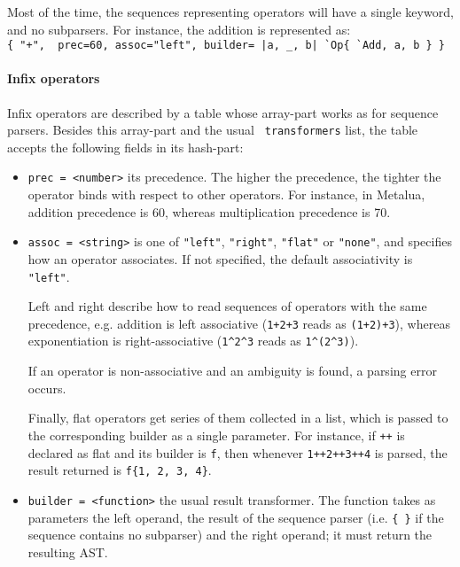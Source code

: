 Most of the time, the sequences representing operators will have a
single keyword, and no subparsers. For instance, the addition is
represented as:\\
\verb~{ "+",  prec=60, assoc="left", builder= |a, _, b| `Op{ `Add, a, b } }~


\paragraph{Infix operators}
Infix operators are described by a table whose array-part works as for
sequence parsers. Besides this array-part and the usual {\tt
  transformers} list, the table accepts the following fields in its hash-part:
\begin{itemize}

\item\verb|prec = <number>| its precedence. The higher the precedence, 
  the tighter the operator binds with respect to other operators. For
  instance, in Metalua, addition precedence is 60, whereas
  multiplication precedence is 70.

\item\verb|assoc = <string>| is one of \verb|"left"|, \verb|"right"|,
  \verb|"flat"| or \verb|"none"|, and specifies how an operator
  associates. If not specified, the default associativity is
  \verb|"left"|. 

  Left and right describe how to read sequences of operators with the
  same precedence, e.g. addition is left associative ({\tt 1+2+3} reads as
  {\tt(1+2)+3}), whereas exponentiation is right-associative (\verb|1^2^3|
  reads as \verb|1^(2^3)|).

  If an operator is non-associative and an ambiguity is found, a
  parsing error occurs. 

  Finally, flat operators get series of them collected in a list,
  which is passed to the corresponding builder as a single
  parameter. For instance, if \verb|++| is declared as flat and its
  builder is \verb|f|, then whenever {\tt 1++2++3++4} is parsed, the
  result returned is {\tt f\{1, 2, 3, 4\}}.

\item\verb|builder = <function>| the usual result transformer. The
  function takes as parameters the left operand, the result of the
  sequence parser (i.e. \verb|{ }| if the sequence contains no
  subparser) and the right operand; it must return the resulting AST.

\end{itemize}

